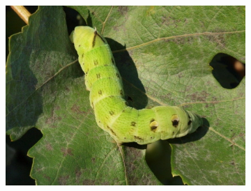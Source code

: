 \begin{figure}[H]
\begin{subfigure}{.32\textwidth}
      \includegraphics[scale=1.0]{obrazky/cropStentifordhousenka.jpg}
    \end{subfigure}
    \vspace{2pt}
    

\end{figure}
